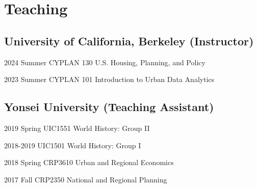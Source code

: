\documentclass[12pt,letterpaper]{report}
\begin{document}
 \section*{Teaching}
    \subsection*{University of California, Berkeley (Instructor)}
    \begin{tablist}
        \item[2024 Summer] \tab{}CYPLAN 130 U.S. Housing, Planning, and Policy
        \item[2023 Summer] \tab{}CYPLAN 101 Introduction to Urban Data Analytics
    \end{tablist}
    \subsection*{Yonsei University (Teaching Assistant)}
    \begin{tablist}
      \item[2019 Spring] \tab{}UIC1551 World History: Group II
      \item[2018-2019] \tab{}UIC1501 World History: Group I 
      \item[2018 Spring] \tab{}CRP3610 Urban and Regional Economics
      \item[2017 Fall] \tab{}CRP2350 National and Regional Planning
    \end{tablist}

  
\end{document}
